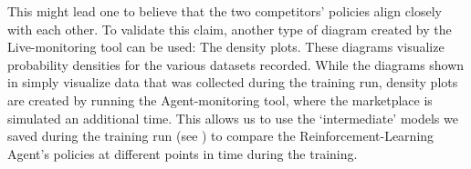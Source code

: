 This might lead one to believe that the two competitors' policies align closely with each other. To validate this claim, another type of diagram created by the Live-monitoring tool can be used: The density plots. These diagrams visualize probability densities for the various datasets recorded. While the diagrams shown in  simply visualize data that was collected during the training run, density plots are created by running the Agent-monitoring tool, where the marketplace is simulated an additional time. This allows us to use the `intermediate' models we saved during the training run (see ) to compare the Reinforcement-Learning Agent's policies at different points in time during the training.


